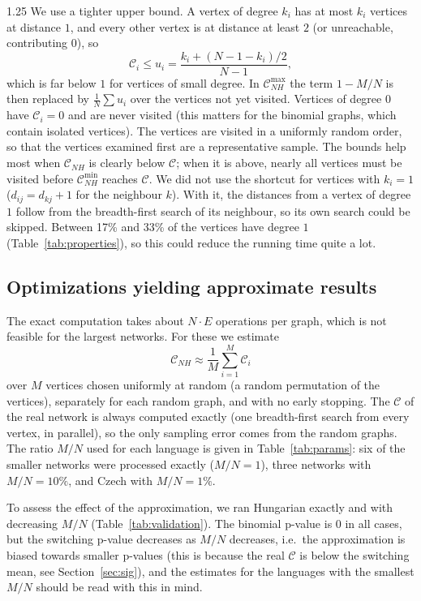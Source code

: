 \documentclass[12pt]{article}
\newcommand{\metric}{\mathcal{C}}
\begin{document}
\begin{spacing}{1.25}
We use a tighter upper bound. A vertex of degree $k_i$ has at most $k_i$ vertices at distance $1$, and every other vertex is at distance at least $2$ (or unreachable, contributing $0$), so
\begin{equation}
    \metric_i \leq u_i = \frac{k_i + (N-1-k_i)/2}{N-1},
\end{equation}
which is far below $1$ for vertices of small degree. In $\metric^{\max}_{NH}$ the term $1-M/N$ is then replaced by $\frac{1}{N}\sum u_i$ over the vertices not yet visited. Vertices of degree $0$ have $\metric_i = 0$ and are never visited (this matters for the binomial graphs, which contain isolated vertices). The vertices are visited in a uniformly random order, so that the vertices examined first are a representative sample. The bounds help most when $\metric_{NH}$ is clearly below $\metric$; when it is above, nearly all vertices must be visited before $\metric^{\min}_{NH}$ reaches $\metric$. We did not use the shortcut for vertices with $k_i = 1$ ($d_{ij} = d_{kj}+1$ for the neighbour $k$). With it, the distances from a vertex of degree $1$ follow from the breadth-first search of its neighbour, so its own search could be skipped. Between 17\% and 33\% of the vertices have degree $1$ (Table~\ref{tab:properties}), so this could reduce the running time quite a lot.

\subsection{Optimizations yielding approximate results}
The exact computation takes about $N\cdot E$ operations per graph, which is not feasible for the largest networks. For these we estimate
\begin{equation}
    \metric_{NH} \approx \frac{1}{M}\sum_{i=1}^{M} \metric_i
\end{equation}
over $M$ vertices chosen uniformly at random (a random permutation of the vertices), separately for each random graph, and with no early stopping. The $\metric$ of the real network is always computed exactly (one breadth-first search from every vertex, in parallel), so the only sampling error comes from the random graphs. The ratio $M/N$ used for each language is given in Table~\ref{tab:params}: six of the smaller networks were processed exactly ($M/N=1$), three networks with $M/N = 10\%$, and Czech with $M/N = 1\%$.

To assess the effect of the approximation, we ran Hungarian exactly and with decreasing $M/N$ (Table~\ref{tab:validation}). The binomial p-value is $0$ in all cases, but the switching p-value decreases as $M/N$ decreases, i.e.\ the approximation is biased towards smaller p-values (this is because the real $\metric$ is below the switching mean, see Section~\ref{sec:sig}), and the estimates for the languages with the smallest $M/N$ should be read with this in mind.


\end{spacing}
\end{document}

